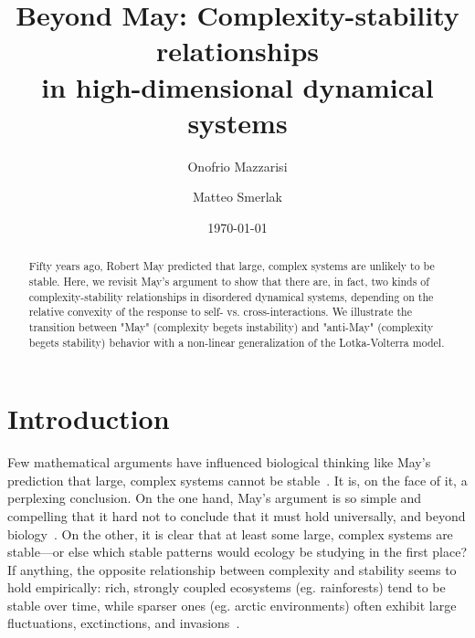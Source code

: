 \documentclass[
 reprint,
 amsmath,amssymb,
 aps,
]{revtex4-2}
\begin{document}
\title{Beyond May: Complexity-stability relationships \\
in high-dimensional dynamical systems}

\author{Onofrio Mazzarisi}
\author{Matteo Smerlak}



\date{\today}%

\begin{abstract}
Fifty years ago, Robert May predicted that large, complex systems are unlikely to be stable. Here, we revisit May's argument to show that there are, in fact, two kinds of complexity-stability relationships in disordered dynamical systems, depending on the relative convexity of the response to self- vs. cross-interactions. We illustrate the transition between "May" (complexity begets instability) and "anti-May" (complexity begets stability) behavior with a non-linear generalization of the Lotka-Volterra model. 
\end{abstract}

\maketitle

\section{Introduction}

Few mathematical arguments have influenced biological thinking like May's
prediction that large, complex systems cannot be stable~\cite{May1972}. 
It is, on the face of it, a perplexing conclusion. 
On the one hand, May's argument is so simple and compelling
that it hard not to conclude that it must hold universally,
and beyond biology~\cite{Haldane2011,Moran2019}. 
On the other, it is clear that at least some large, 
complex systems are stable---or else which stable patterns 
would ecology be studying in the first place? If anything, 
the opposite relationship between complexity and stability 
seems to hold empirically: rich, strongly coupled ecosystems 
(eg. rainforests) tend to be  stable over time, while sparser ones 
(eg. arctic environments) often exhibit large fluctuations, 
exctinctions, and invasions~\cite{Loreau2022,McCann2000,Hutchinson1959,Odum1959,MacArthur1955}. 
\end{document}
